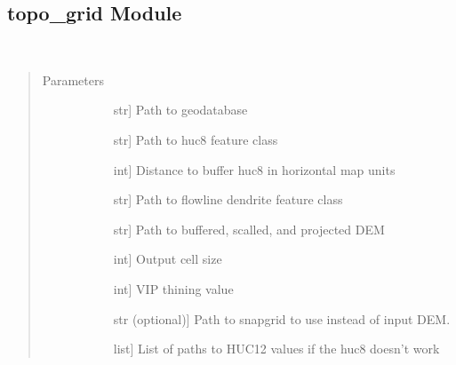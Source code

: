 \documentclass[letterpaper,10pt,english]{sphinxmanual}
\begin{document}
\subsection{topo\_grid Module}
\label{\detokenize{topo_grid:module-topo_grid}}\label{\detokenize{topo_grid:topo-grid-module}}\label{\detokenize{topo_grid::doc}}

\begin{fulllineitems}
\label{\detokenize{topo_grid:topo_grid.topogrid}}~\begin{quote}\begin{description}
\item[{Parameters}] \leavevmode\begin{description}
\item[{}] \leavevmode{[}str{]}
Path to geodatabase

\item[{}] \leavevmode{[}str{]}
Path to huc8 feature class

\item[{}] \leavevmode{[}int{]}
Distance to buffer huc8 in horizontal map units

\item[{}] \leavevmode{[}str{]}
Path to flowline dendrite feature class

\item[{}] \leavevmode{[}str{]}
Path to buffered, scalled, and projected DEM

\item[{}] \leavevmode{[}int{]}
Output cell size

\item[{}] \leavevmode{[}int{]}
VIP thining value

\item[{}] \leavevmode{[}str (optional){]}
Path to snapgrid to use instead of input DEM.

\item[{}] \leavevmode{[}list{]}
List of paths to HUC12 values if the huc8 doesn’t work


\end{description}
\end{description}
\end{quote}
\end{fulllineitems}
\end{document}
